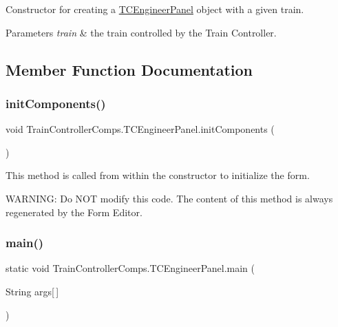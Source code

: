 Constructor for creating a \hyperlink{classTrainControllerComps_1_1TCEngineerPanel}{T\+C\+Engineer\+Panel} object with a given train. 


\begin{DoxyParams}{Parameters}
{\em train} & the train controlled by the Train Controller. \\
\hline
\end{DoxyParams}


\subsection{Member Function Documentation}
\mbox{\label{classTrainControllerComps_1_1TCEngineerPanel_ac63c0a96eec1b142f085a0dd1bb6fd08}} 
\subsubsection{\texorpdfstring{init\+Components()}{initComponents()}}
{\footnotesize\ttfamily void Train\+Controller\+Comps.\+T\+C\+Engineer\+Panel.\+init\+Components (\begin{DoxyParamCaption}{ }\end{DoxyParamCaption})\hspace{0.3cm}{\ttfamily [private]}}



This method is called from within the constructor to initialize the form. 

W\+A\+R\+N\+I\+NG\+: Do N\+OT modify this code. The content of this method is always regenerated by the Form Editor. \mbox{\label{classTrainControllerComps_1_1TCEngineerPanel_a6803d6eb57e0d56c9d2fa5761d646b81}} 
\subsubsection{\texorpdfstring{main()}{main()}}
{\footnotesize\ttfamily static void Train\+Controller\+Comps.\+T\+C\+Engineer\+Panel.\+main (\begin{DoxyParamCaption}\item[{String}]{args\mbox{[}$\,$\mbox{]} }\end{DoxyParamCaption})\hspace{0.3cm}{\ttfamily [static]}}


